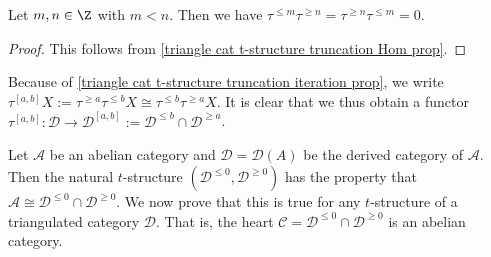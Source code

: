 \begin{corollary}\label{triangle cat t-structure truncation orthogonal prop}
Let $m,n\in\Z$ with $m<n$. Then we have $\tau^{\leq m}\tau^{\geq n}=\tau^{\geq n}\tau^{\leq m}=0$.
\end{corollary}
\begin{proof}
This follows from \cref{triangle cat t-structure truncation Hom prop}.
\end{proof}

Because of \cref{triangle cat t-structure truncation iteration prop}, we write $\tau^{[a,b]}X:=\tau^{\geq a}\tau^{\leq b}X\cong\tau^{\leq b}\tau^{\geq a}X$. It is clear that we thus obtain a functor $\tau^{[a,b]}:\mathcal{D}\to\mathcal{D}^{[a,b]}:=\mathcal{D}^{\leq b}\cap\mathcal{D}^{\geq a}$.\par

Let $\mathcal{A}$ be an abelian category and $\mathcal{D}=\mathcal{D}(A)$ be the derived category of $\mathcal{A}$. Then the natural $t$-structure $(\mathcal{D}^{\leq 0},\mathcal{D}^{\geq 0})$ has the property that $\mathcal{A}\cong\mathcal{D}^{\leq 0}\cap\mathcal{D}^{\geq 0}$. We now prove that this is true for any $t$-structure of a triangulated category $\mathcal{D}$. That is, the heart $\mathcal{C}=\mathcal{D}^{\leq 0}\cap\mathcal{D}^{\geq 0}$ is an abelian category.

